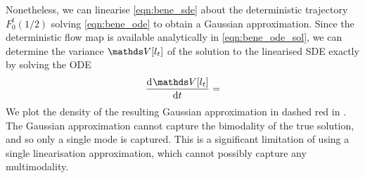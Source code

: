 Nonetheless, we can linearise \cref{eqn:bene_sde} about the deterministic trajectory \(F_0^t\!\left(1/2\right)\) solving \cref{eqn:bene_ode} to obtain a Gaussian approximation.
Since the deterministic flow map is available analytically in \cref{eqn:bene_ode_sol}, we can determine the variance \(\var{l_t}\) of the solution to the linearised SDE exactly by solving the ODE
\[
	\dod{\var{l_t}}{t} =
\]
We plot the density of the resulting Gaussian approximation in dashed red in .
The Gaussian approximation cannot capture the bimodality of the true solution, and so only a single mode is captured.
This is a significant limitation of using a single linearisation approximation, which cannot possibly capture any multimodality.






